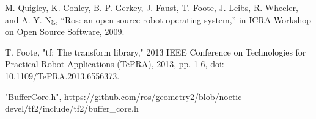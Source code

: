 \documentclass{article}
\begin{document}
\begin{multicols}{2}
\begin{thebibliography}{99}
 M. Quigley, K. Conley, B. P. Gerkey, J. Faust, T. Foote, J. Leibs, R. Wheeler, and A. Y. Ng, “Ros: an open-source robot operating system,” in ICRA Workshop on Open Source Software, 2009.

 T. Foote, "tf: The transform library," 2013 IEEE Conference on Technologies for Practical Robot Applications (TePRA), 2013, pp. 1-6, doi: 10.1109/TePRA.2013.6556373.

 "BufferCore.h", https://github.com/ros/geometry2/blob/noetic-devel/tf2/include/tf2/buffer\_core.h

\end{thebibliography}
	
\end{multicols}	
\end{document}
